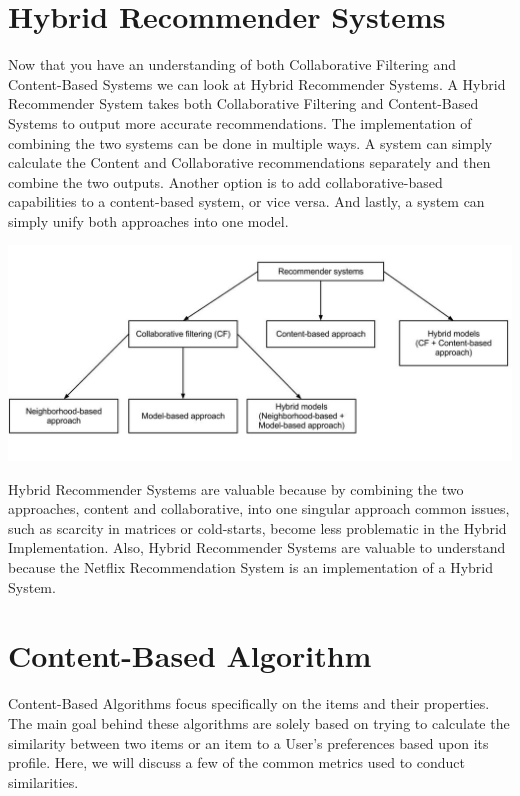 \documentclass[11pt,reqno]{amsart}
\theoremstyle{definition}
\numberwithin{equation}{subsection}
\begin{document}
\section{Hybrid Recommender Systems}

 Now that you have an understanding of both Collaborative Filtering and Content-Based Systems we can look at Hybrid Recommender Systems.  A Hybrid Recommender System takes both Collaborative Filtering and Content-Based Systems to output more accurate recommendations.  The implementation of combining the two systems can be done in multiple ways.  A system can simply calculate the Content and Collaborative recommendations separately and then combine the two outputs.  Another option is to add collaborative-based capabilities to a content-based system, or vice versa.  And lastly, a system can simply unify both approaches into one model.
 
 
 
\includegraphics[width=\textwidth]{pic1.jpg}


 
 Hybrid Recommender Systems are valuable because by combining the two approaches, content and collaborative, into one singular approach common issues, such as scarcity in matrices or cold-starts, become less problematic in the Hybrid Implementation. Also, Hybrid Recommender Systems are valuable to understand because the Netflix Recommendation System is an implementation of a Hybrid System.
\newline
 
\section{Content-Based Algorithm}

Content-Based Algorithms focus specifically on the items and their properties. The main goal behind these algorithms are solely based on trying to calculate the similarity between two items or an item to a User's preferences based upon its profile.
Here, we will discuss a few of the common metrics used to conduct similarities. 
\end{document}

